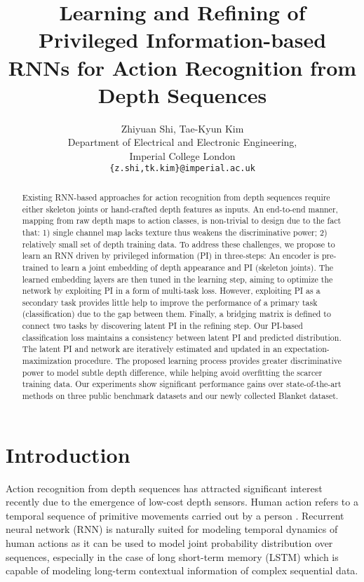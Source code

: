 \documentclass[10pt,twocolumn,letterpaper]{article}
\begin{document}
\title{Learning and Refining of Privileged Information-based RNNs for Action Recognition from Depth Sequences}

\author{Zhiyuan Shi, Tae-Kyun Kim\\
Department of Electrical and Electronic Engineering,\\
Imperial College London\\
{\tt\small \{z.shi,tk.kim\}@imperial.ac.uk}
}

\maketitle


\begin{abstract}
Existing RNN-based approaches for action recognition from depth sequences require either skeleton joints or hand-crafted depth features as inputs. An end-to-end manner, mapping from raw depth maps to action classes, is non-trivial to design due to the fact that: 1) single channel map lacks texture thus weakens the discriminative power; 2) relatively small set of depth training data. To address these challenges, we propose to learn an RNN driven by privileged information (PI) in three-steps: An encoder is pre-trained to learn a joint embedding of depth appearance and PI (\ie skeleton joints). The learned embedding layers are then tuned in the learning step, aiming to optimize the network by exploiting PI in a form of multi-task loss. However, exploiting PI as a secondary task provides little help to improve the performance of a primary task (\ie classification) due to the gap between them. Finally, a bridging matrix is defined to connect two tasks by discovering latent PI in the refining step. Our PI-based classification loss maintains a consistency between latent PI and predicted distribution. The latent PI and network are iteratively estimated and updated in an expectation-maximization procedure. The proposed learning process provides greater discriminative power to model subtle depth difference, while helping avoid overfitting the scarcer training data. Our experiments show significant performance gains over state-of-the-art methods on three public benchmark datasets and our newly collected Blanket dataset.
\end{abstract}
\vspace{-0.3cm}
\section{Introduction}
Action recognition from depth sequences \cite{Yang_tpami_2016,Omar_cvpr_2013,Jiajia_iccv_2013,Vieira_2012,wang2015cnn} has attracted significant interest recently due to the emergence of low-cost depth sensors. Human action refers to a temporal sequence of primitive movements carried out by a person \cite{action_1992}. Recurrent neural network (RNN) \cite{Graves_2012_book} is naturally suited for modeling temporal dynamics of human actions as it can be used to model joint probability distribution over sequences, especially in the case of long short-term memory (LSTM) \cite{Hochreiter_1997} which is capable of modeling long-term contextual information of complex sequential data.
\end{document}
